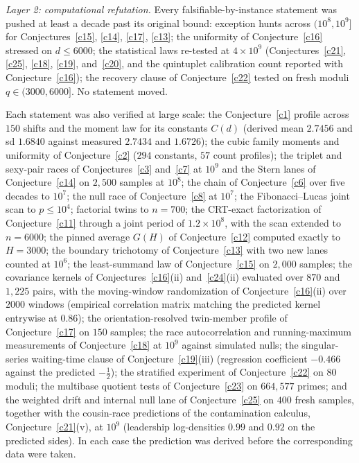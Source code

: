 \documentclass[11pt]{article}
\theoremstyle{definition}
\begin{document}
\emph{Layer 2: computational refutation.}  Every
falsifiable-by-instance statement was pushed at least a decade past its
original bound: exception hunts across $(10^8,10^9]$ for
Conjectures~\ref{c15}, \ref{c14}, \ref{c17}, \ref{c13}; the uniformity
of Conjecture~\ref{c16} stressed on $d\le6000$; the statistical laws
re-tested at $4\times10^9$ (Conjectures~\ref{c21}, \ref{c25},
\ref{c18}, \ref{c19}, and~\ref{c20}, and the quintuplet calibration
count reported with Conjecture~\ref{c16}); the recovery clause of
Conjecture~\ref{c22} tested on fresh moduli $q\in(3000,6000]$.  No
statement moved.

Each statement was also verified at large scale: the
Conjecture~\ref{c1} profile across $150$ shifts and the moment law for
its constants $C(d)$ (derived mean $2.7456$ and sd $1.6840$ against
measured $2.7434$ and $1.6726$); the cubic family moments and
uniformity of Conjecture~\ref{c2} ($294$ constants, $57$ count
profiles); the triplet and sexy-pair races of Conjectures~\ref{c3}
and~\ref{c7} at $10^9$ and the Stern lanes of Conjecture~\ref{c14} on
$2{,}500$ samples at $10^8$; the chain of Conjecture~\ref{c6} over five
decades to $10^7$; the null race of Conjecture~\ref{c8} at $10^7$; the
Fibonacci--Lucas joint scan to $p\le10^4$; factorial twins to $n=700$;
the CRT-exact factorization of Conjecture~\ref{c11} through a joint
period of $1.2\times10^8$, with the scan extended to $n=6000$; the
pinned average $G(H)$ of Conjecture~\ref{c12} computed exactly to
$H=3000$; the boundary trichotomy of Conjecture~\ref{c13} with two new
lanes counted at $10^6$; the least-summand law of
Conjecture~\ref{c15} on $2{,}000$ samples; the covariance kernels of
Conjectures~\ref{c16}(ii) and~\ref{c24}(ii) evaluated over $870$ and
$1{,}225$ pairs, with the moving-window randomization of
Conjecture~\ref{c16}(ii) over $2000$ windows (empirical correlation
matrix matching the predicted kernel entrywise at $0.86$); the
orientation-resolved twin-member profile of Conjecture~\ref{c17} on
$150$ samples; the race autocorrelation and running-maximum
measurements of Conjecture~\ref{c18} at $10^9$ against simulated
nulls; the singular-series waiting-time clause of
Conjecture~\ref{c19}(iii) (regression coefficient $-0.466$ against the
predicted $-\tfrac12$); the stratified experiment of
Conjecture~\ref{c22} on $80$ moduli; the multibase quotient tests of
Conjecture~\ref{c23} on $664{,}577$ primes; and the weighted drift and
internal null lane of Conjecture~\ref{c25} on $400$ fresh samples,
together with the cousin-race predictions of the contamination
calculus, Conjecture~\ref{c21}(v), at $10^9$ (leadership log-densities
$0.99$ and $0.92$ on the predicted sides).  In each case the
prediction was derived before the corresponding data were taken.
\end{document}
